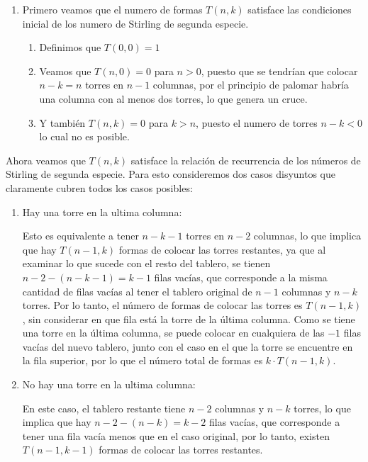 \begin{solution}
    \begin{enumerate}
        \item Primero veamos que el numero de formas $T(n,k)$ satisface las condiciones inicial de los numero de Stirling de segunda especie.
        \begin{enumerate}
            \item Definimos que $T(0,0)=1$
            \item Veamos que $T(n,0)=0$ para $n>0$, puesto que se tendrían que colocar $n-k=n$ torres en $n-1$ columnas, por el principio de palomar habría una columna con al menos dos torres, lo que genera un cruce.
            \item Y también $T(n,k) =0$ para $k>n$, puesto el numero de torres $n-k<0$ lo cual no es posible.
            \end{enumerate}
    \end{enumerate}
    \item  Ahora veamos que $T(n,k)$ satisface la relación de recurrencia de los números de Stirling de segunda especie. Para esto consideremos dos casos disyuntos que claramente cubren todos los casos posibles:
    \begin{enumerate}
        \item Hay una torre en la ultima columna:
        
        Esto es equivalente a tener $n-k-1$ torres en $n-2$ columnas, lo que implica que hay $T(n-1,k)$ formas de colocar las torres restantes, ya que al examinar lo que sucede con el resto del tablero, se tienen $n-2-(n-k-1)=k-1$ filas vacías, que corresponde a la misma cantidad de filas vacías al tener el tablero original de $n-1$ columnas y $n-k$ torres. Por lo tanto, el número de formas de colocar las torres es $T(n-1,k)$, sin considerar en que fila está la torre de la última columna. Como se tiene una torre en la última columna, se puede colocar en cualquiera de las $-1$ filas vacías del nuevo tablero, junto con el caso en el que la torre se encuentre en la fila superior, por lo que el número total de formas es $k \cdot T(n-1,k)$.
        \item No hay una torre en la ultima columna:
        
        En este caso, el tablero restante tiene $n-2$ columnas y $n-k$ torres, lo que implica que hay $n-2-(n-k)=k-2$ filas vacías, que corresponde a tener una fila vacía menos que en el caso original, por lo tanto, existen $T(n-1,k-1)$ formas de colocar las torres restantes.
    \end{enumerate}
\end{solution}